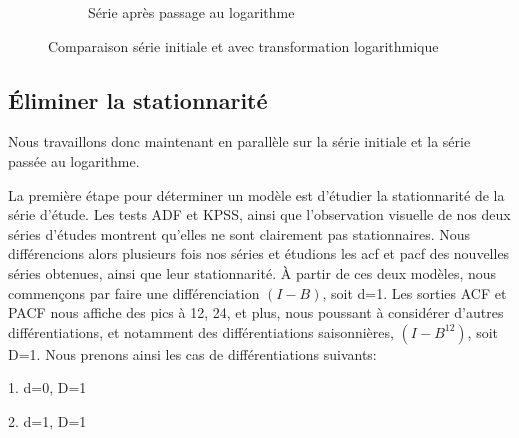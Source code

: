 \documentclass[12pt,a4paper]{book}
\newcommand{\1}{\mathds{1}}
\begin{document}
\begin{figure}[h!]
\begin{subfigure}{.4\textwidth}
    	\caption{Série après passage au logarithme}
    	\label{fig:sub2}
    \end{subfigure}

\caption{Comparaison série initiale et avec transformation logarithmique}
\label{fig:1}
   
\end{figure}



\vspace{5 mm}
\subsection{Éliminer la stationnarité}

\vspace{5 mm}

Nous travaillons donc maintenant en parallèle sur la série initiale et la série passée au logarithme.


La première étape pour déterminer un modèle est d'étudier la stationnarité de la série d'étude. Les tests ADF et KPSS, ainsi que l'observation visuelle de nos deux séries d'études montrent qu'elles ne sont clairement pas stationnaires.
Nous différencions alors plusieurs fois nos séries et étudions les acf et pacf des nouvelles séries obtenues, ainsi que leur stationnarité. 
À partir de ces deux modèles, nous commençons par faire une différenciation $(I-B)$, soit d=1. Les sorties ACF et PACF nous affiche des pics à 12, 24, et plus, nous poussant à considérer d'autres différentiations, et notamment des différentiations saisonnières, $(I-B^{12})$, soit D=1. Nous prenons ainsi les cas de différentiations suivants:
\begin{description}
  \item 1. d=0, D=1
  \item 2. d=1, D=1
\end{description}
\noindent 
\end{document}
